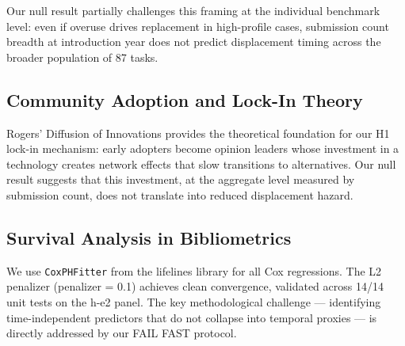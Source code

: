 Our null result partially challenges this framing at the individual benchmark level: even if overuse drives replacement in high-profile cases, submission count breadth at introduction year does not predict displacement timing across the broader population of 87 tasks.

\subsection{Community Adoption and Lock-In Theory}

Rogers' Diffusion of Innovations \cite{rogers2003diffusion} provides the theoretical foundation for our H1 lock-in mechanism: early adopters become opinion leaders whose investment in a technology creates network effects that slow transitions to alternatives. Our null result suggests that this investment, at the aggregate level measured by submission count, does not translate into reduced displacement hazard.

\subsection{Survival Analysis in Bibliometrics}

We use \texttt{CoxPHFitter} from the lifelines library \cite{davidson2019lifelines} for all Cox regressions. The L2 penalizer (penalizer = 0.1) achieves clean convergence, validated across 14/14 unit tests on the h-e2 panel. The key methodological challenge --- identifying time-independent predictors that do not collapse into temporal proxies --- is directly addressed by our FAIL FAST protocol.
